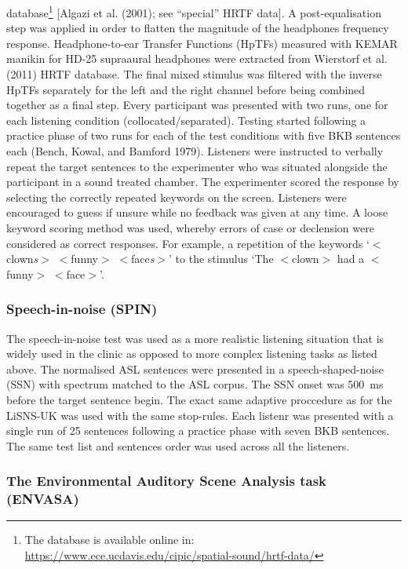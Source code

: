 \documentclass[a4paper,nobind]{templates/ociamthesis}
\begin{document}
database\footnote{The database is available online in: \url{https://www.ece.ucdavis.edu/cipic/spatial-sound/hrtf-data/}} {[}Algazi et al. (2001); see ``special'' HRTF data{]}. A post-equalisation step was applied in order to flatten the magnitude of the headphones frequency response. Headphone-to-ear Transfer Functions (HpTFs) measured with KEMAR manikin for HD-25 supraaural headphones were extracted from Wierstorf et al. (2011) HRTF database. The final mixed stimulus was filtered with the inverse HpTFs separately for the left and the right channel before being combined together as a final step. Every participant was presented with two runs, one for each listening condition (collocated/separated). Testing started following a practice phase of two runs for each of the test conditions with five BKB sentences each (Bench, Kowal, and Bamford 1979). Listeners were instructed to verbally repeat the target sentences to the experimenter who was situated alongside the participant in a sound treated chamber. The experimenter scored the response by selecting the correctly repeated keywords on the screen. Listeners were encouraged to guess if unsure while no feedback was given at any time. A loose keyword scoring method was used, whereby errors of case or declension were considered as correct responses. For example, a repetition of the keywords `\(<\)clown\emph{s}\(>\) \(<\)funny\(>\) \(<\)face\emph{s}\(>\)' to the stimulus `The \(<\)clown\(>\) had a \(<\)funny\(>\) \(<\)face\(>\)'.

\hypertarget{speech-in-noise-spin}{%
\subsubsection{Speech-in-noise (SPIN)}\label{speech-in-noise-spin}}

The speech-in-noise test was used as a more realistic listening situation that is widely used in the clinic as opposed to more complex listening tasks as listed above. The normalised ASL sentences were presented in a speech-shaped-noise (SSN) with spectrum matched to the ASL corpus. The SSN onset was 500~ms before the target sentence begin. The exact same adaptive proccedure as for the LiSNS-UK was used with the same stop-rules. Each listenr was presented with a single run of 25 sentences following a practice phase with seven BKB sentences. The same test list and sentences order was used across all the listeners.

\hypertarget{the-environmental-auditory-scene-analysis-task-envasa}{%
\subsubsection{The Environmental Auditory Scene Analysis task (ENVASA)}\label{the-environmental-auditory-scene-analysis-task-envasa}}
\end{document}
